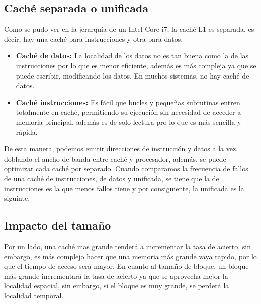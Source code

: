 \subsection{Caché separada o unificada}
Como se pudo ver en la jerarquía de un Intel Core i7, la caché L1 es separada, es decir, hay una caché para instrucciones y otra para datos.
\begin{itemize}
    \item \textbf{Caché de datos:} La localidad de los datos no es tan buena como la de las instrucciones por lo que es menor eficiente, además es más compleja ya
        que se puede escribir, modificando los datos. En muchos sistemas, no hay caché de datos.
    \item \textbf{Caché instrucciones:} Es fácil que bucles y pequeñas subrutinas entren totalmente en caché, permitiendo su ejecución sin necesidad de acceder a memoria principal, además es de solo lectura pro lo que 
        es más sencilla y rápida.
\end{itemize}
De esta manera, podemos emitir direcciones de instrucción y datos a la vez, doblando el ancho de banda entre caché y procesador, además, se puede optimizar cada caché por separado.
Cuando comparamos la frecuencia de fallos de una caché de instrucciones, de datos y unificada, se tiene que la de instrucciones es la que menos fallos tiene y por consiguiente, la unificada es la siguinte.
\subsection{Impacto del tamaño}
Por un lado, una caché mas grande tenderá a incrementar la tasa de acierto, sin embargo, es más complejo hacer que una memoria más grande vaya rapido, por lo que el tiempo de acceso será mayor.
En cuanto al tamaño de bloque, un bloque más grande incrementará la tasa de acierto ya que se aprovecha mejor la localidad espacial, sin embargo, si el bloque es muy grande, se perderá la localidad temporal.
